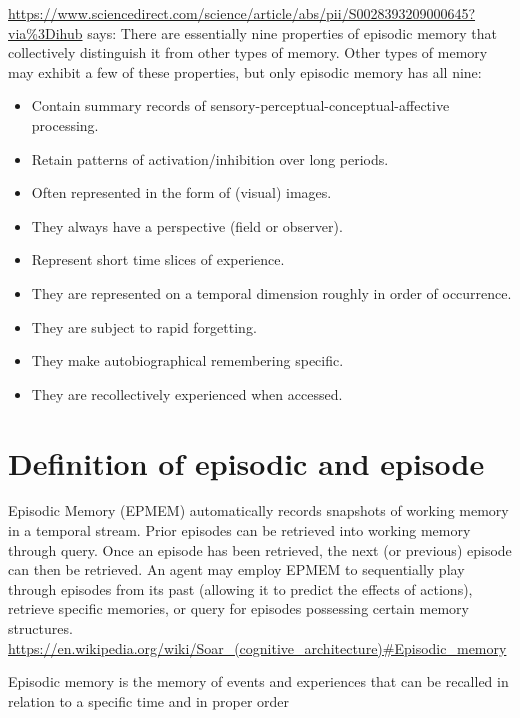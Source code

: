 \documentclass[a4paper]{article}
\title{}
\date{}
\begin{document}
    \maketitle
    \url{https://www.sciencedirect.com/science/article/abs/pii/S0028393209000645?via%3Dihub} says:
    There are essentially nine properties of episodic memory that collectively distinguish it from other types of memory. Other types of memory may exhibit a few of these properties, but only episodic memory has all nine:
    
    \begin{itemize}
        \item Contain summary records of sensory-perceptual-conceptual-affective processing.
        \item Retain patterns of activation/inhibition over long periods.
        \item Often represented in the form of (visual) images.
        \item They always have a perspective (field or observer).
        \item Represent short time slices of experience.
        \item They are represented on a temporal dimension roughly in order of occurrence.
        \item They are subject to rapid forgetting.
        \item They make autobiographical remembering specific.
        \item They are recollectively experienced when accessed.
    \end{itemize}
    
    \section{Definition of episodic and episode}
    Episodic Memory (EPMEM) automatically records snapshots of working memory in a temporal stream. Prior episodes can be retrieved into working memory through query. Once an episode has been retrieved, the next (or previous) episode can then be retrieved. An agent may employ EPMEM to sequentially play through episodes from its past (allowing it to predict the effects of actions), retrieve specific memories, or query for episodes possessing certain memory structures. \url{https://en.wikipedia.org/wiki/Soar_(cognitive_architecture)#Episodic_memory}
    
    Episodic memory is the memory of events and experiences that can be recalled in relation to a specific time and in proper order \cite{tulving-2002-episodic-memory-from-mind-to-brain}
    
\end{document}
